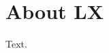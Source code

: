 \documentclass{article}
\newcommand{\lx}{LX\xspace}
\begin{document}
\section{About \lx}
Text.
\end{document}
